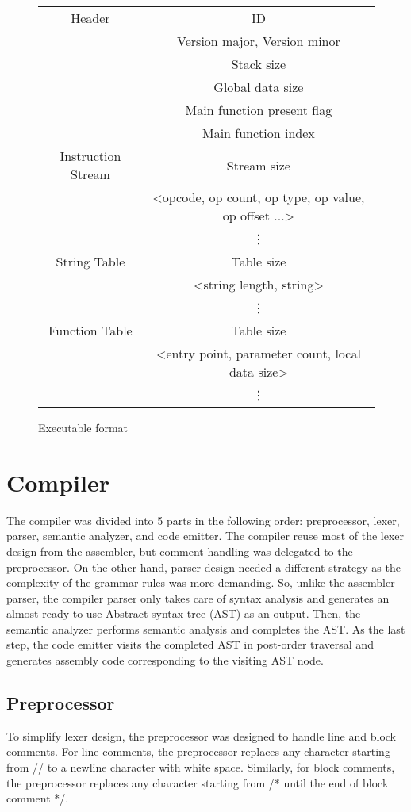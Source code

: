 \documentclass[manuscript,screen,nonacm]{acmart}
\begin{document}
\begin{figure}[H]
\begin{center}
\begin{tabular}{| c | c |}
    \hline
    Header & ID \\
    ~ & Version major, Version minor \\
    ~ & Stack size \\
    ~ & Global data size \\
    ~ & Main function present flag \\
    ~ & Main function index \\
    \hline
    Instruction Stream & Stream size \\
    ~ & <opcode, op count, op type, op value, op offset ...> \\
    ~ & \vdots \\
    \hline
    String Table & Table size \\
    ~ & <string length, string> \\
    ~ & \vdots \\
    \hline
    Function Table & Table size \\
    ~ & <entry point, parameter count, local data size> \\
    ~ & \vdots \\
    \hline
\end{tabular}
\end{center}
\caption{Executable format} 
\label{executable format}
\end{figure}


\section{Compiler}
The compiler was divided into 5 parts in the following order: preprocessor, lexer, parser, semantic analyzer, and code emitter. The compiler reuse most of the lexer design from the assembler, but comment handling was delegated to the preprocessor. On the other hand, parser design needed a different strategy as the complexity of the grammar rules was more demanding. So, unlike the assembler parser, the compiler parser only takes care of syntax analysis and generates an almost ready-to-use Abstract syntax tree (AST) as an output. Then, the semantic analyzer performs semantic analysis and completes the AST. As the last step, the code emitter visits the completed AST in post-order traversal and generates assembly code corresponding to the visiting AST node.

\subsection{Preprocessor}
To simplify lexer design, the preprocessor was designed to handle line and block comments. For line comments, the preprocessor replaces any character starting from // to a newline character with white space. Similarly, for block comments, the preprocessor replaces any character starting from /* until the end of block comment */.
\end{document}
